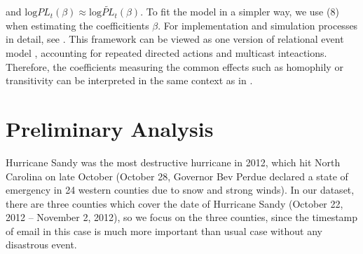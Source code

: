 \documentclass[a4paper]{article}
\begin{document}
and $\mbox{log}PL_t(\beta)\approx \mbox{log}\widetilde{PL}_t(\beta)$. To fit the model in a simpler way, we use (8) when estimating the coefficitients $\beta$. For implementation and simulation processes in detail, see \cite{PerryWolfe2012}.  This framework can be viewed as one version of relational event model \cite{Butts2008}, accounting for repeated directed actions and multicast inteactions. Therefore, the coefficients measuring the common effects such as homophily or transitivity can be interpreted in the same context as in \cite{Butts2008}.
\section{Preliminary Analysis}
Hurricane Sandy was the most destructive hurricane in 2012, which hit North Carolina on late October (October 28, Governor Bev Perdue declared a state of emergency in 24 western counties due to snow and strong winds). In our dataset, there are three counties which cover the date of Hurricane Sandy (October 22, 2012 – November 2, 2012), so we focus on the three counties, since the timestamp of email in this case is much more important than usual case without any disastrous event.
\end{document}
